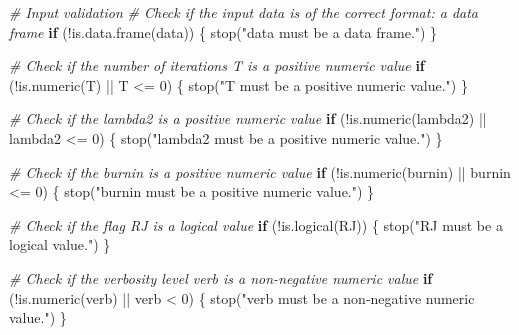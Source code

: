 \documentclass[
  11pt,
]{article}
\newenvironment{Shaded}{}{}
\newcommand{\CommentTok}[1]{\textcolor[rgb]{0.38,0.63,0.69}{\textit{#1}}}
\newcommand{\ControlFlowTok}[1]{\textcolor[rgb]{0.00,0.44,0.13}{\textbf{#1}}}
\newcommand{\DecValTok}[1]{\textcolor[rgb]{0.25,0.63,0.44}{#1}}
\newcommand{\FunctionTok}[1]{\textcolor[rgb]{0.02,0.16,0.49}{#1}}
\newcommand{\NormalTok}[1]{#1}
\newcommand{\SpecialCharTok}[1]{\textcolor[rgb]{0.25,0.44,0.63}{#1}}
\newcommand{\StringTok}[1]{\textcolor[rgb]{0.25,0.44,0.63}{#1}}
\begin{document}
\begin{Shaded}
\begin{Highlighting}[]
  \CommentTok{\# Input validation}
  \CommentTok{\# Check if the input data is of the correct format: a data frame}
  \ControlFlowTok{if}\NormalTok{ (}\SpecialCharTok{!}\FunctionTok{is.data.frame}\NormalTok{(data)) \{}
    \FunctionTok{stop}\NormalTok{(}\StringTok{"\textquotesingle{}data\textquotesingle{} must be a data frame."}\NormalTok{)}
\NormalTok{  \}}
  
  \CommentTok{\# Check if the number of iterations \textquotesingle{}T\textquotesingle{} is a positive numeric value}
  \ControlFlowTok{if}\NormalTok{ (}\SpecialCharTok{!}\FunctionTok{is.numeric}\NormalTok{(T) }\SpecialCharTok{||}\NormalTok{ T }\SpecialCharTok{\textless{}=} \DecValTok{0}\NormalTok{) \{}
    \FunctionTok{stop}\NormalTok{(}\StringTok{"\textquotesingle{}T\textquotesingle{} must be a positive numeric value."}\NormalTok{)}
\NormalTok{  \}}
  
  \CommentTok{\# Check if the lambda2 is a positive numeric value}
  \ControlFlowTok{if}\NormalTok{ (}\SpecialCharTok{!}\FunctionTok{is.numeric}\NormalTok{(lambda2) }\SpecialCharTok{||}\NormalTok{ lambda2 }\SpecialCharTok{\textless{}=} \DecValTok{0}\NormalTok{) \{}
    \FunctionTok{stop}\NormalTok{(}\StringTok{"\textquotesingle{}lambda2\textquotesingle{} must be a positive numeric value."}\NormalTok{)}
\NormalTok{  \}}
  
  \CommentTok{\# Check if the burnin is a positive numeric value}
  \ControlFlowTok{if}\NormalTok{ (}\SpecialCharTok{!}\FunctionTok{is.numeric}\NormalTok{(burnin) }\SpecialCharTok{||}\NormalTok{ burnin }\SpecialCharTok{\textless{}=} \DecValTok{0}\NormalTok{) \{}
    \FunctionTok{stop}\NormalTok{(}\StringTok{"\textquotesingle{}burnin\textquotesingle{} must be a positive numeric value."}\NormalTok{)}
\NormalTok{  \}}
  
  \CommentTok{\# Check if the flag \textquotesingle{}RJ\textquotesingle{} is a logical value}
  \ControlFlowTok{if}\NormalTok{ (}\SpecialCharTok{!}\FunctionTok{is.logical}\NormalTok{(RJ)) \{}
    \FunctionTok{stop}\NormalTok{(}\StringTok{"\textquotesingle{}RJ\textquotesingle{} must be a logical value."}\NormalTok{)}
\NormalTok{  \}}
  
  \CommentTok{\# Check if the verbosity level \textquotesingle{}verb\textquotesingle{} is a non{-}negative numeric value}
  \ControlFlowTok{if}\NormalTok{ (}\SpecialCharTok{!}\FunctionTok{is.numeric}\NormalTok{(verb) }\SpecialCharTok{||}\NormalTok{ verb }\SpecialCharTok{\textless{}} \DecValTok{0}\NormalTok{) \{}
    \FunctionTok{stop}\NormalTok{(}\StringTok{"\textquotesingle{}verb\textquotesingle{} must be a non{-}negative numeric value."}\NormalTok{)}
\NormalTok{  \}}
  

\end{Highlighting}
\end{Shaded}
\end{document}
